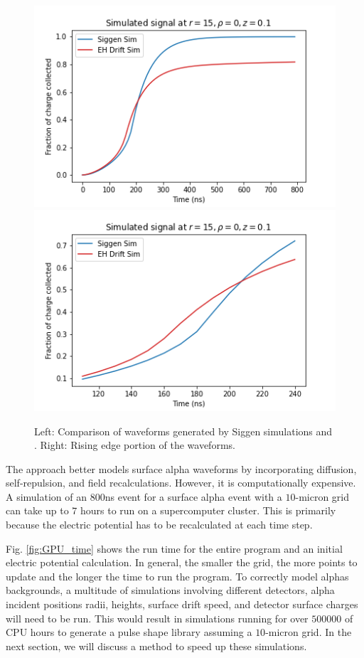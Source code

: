 \begin{figure}
\centering
\includegraphics[width=0.49\linewidth]{ch3/figs/sims_comp.png}
\includegraphics[width=0.49\linewidth]{ch3/figs/sims_comp_enlarged.png}
\caption{Left: Comparison of waveforms generated by Siggen simulations and {\tdsim}. Right: Rising edge portion of the waveforms.}
\label{fig:siggen_waveform_comp}
\end{figure}

The {\tdsim} approach better models surface alpha waveforms by incorporating diffusion, self-repulsion, and field recalculations. However, it is computationally expensive. A simulation of an $800$ns event for a surface alpha event with a $10$-micron grid can take up to $7$ hours to run on a supercomputer cluster. This is primarily because the electric potential has to be recalculated at each time step.


Fig. \ref{fig:GPU_time} shows the run time for the entire program and an initial electric potential calculation. In general, the smaller the grid, the more points to update and the longer the time to run the program. To correctly model alphas backgrounds, a multitude of simulations involving different detectors, alpha incident positions radii, heights, surface drift speed, and detector surface charges will need to be run. This would result in simulations running for over $500000$ of CPU hours to generate a pulse shape library assuming a $10$-micron grid. In the next section, we will discuss a method to speed up these simulations.


